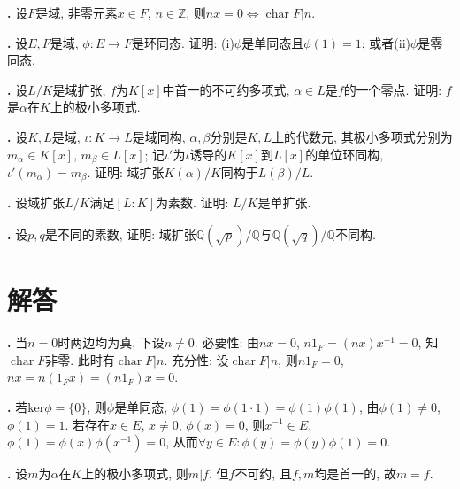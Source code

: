 \par \textbf{\theprobfld .} 设$F$是域, 非零元素$x\in F$, $n\in \mathbb{Z}$, 则$nx=0 \iff \operatorname{char} F | n$. 

\par \textbf{\theprobfld .} \cite{AlXX} 设$E, F$是域, $\phi: E\to F$是环同态. 证明: (i)$\phi$是单同态且$\phi(1)=1$; 或者(ii)$\phi$是零同态. 

\par \textbf{\theprobfld .} \cite{GTS} 设$L/K$是域扩张, $f$为$K[x]$中首一的不可约多项式, $\alpha \in L$是$f$的一个零点. 证明: $f$是$\alpha$在$K$上的极小多项式. 

\par \textbf{\theprobfld .} \cite{GTS} 设$K,L$是域, $\iota: K\to L$是域同构, $\alpha, \beta$分别是$K,L$上的代数元, 其极小多项式分别为$m_\alpha \in K[x]$, $m_\beta \in L[x]$; 记$\iota'$为$\iota$诱导的$K[x]$到$L[x]$的单位环同构, $\iota'(m_\alpha)=m_\beta$. 证明: 域扩张$K(\alpha)/K$同构于$L(\beta)/L$.  

\par \textbf{\theprobfld .} \cite{GTS} 设域扩张$L/K$满足$[L:K]$为素数. 证明: $L/K$是单扩张. 

\par \textbf{\theprobfld .} 设$p,q$是不同的素数, 证明: 域扩张$\mathbb{Q}(\sqrt{p})/\mathbb{Q}$与$\mathbb{Q}(\sqrt{q})/\mathbb{Q}$不同构. 



\section*{解答}

\par \textbf{\thesolfld .} 当$n=0$时两边均为真, 下设$n\neq 0$. 必要性: 由$nx=0$, $n1_F=(nx)x^{-1}=0$, 知$\operatorname{char}F$非零. 此时有$\operatorname{char}F \vert n$. 充分性: 设$\operatorname{char}F \vert n$, 则$n1_F=0$, $nx=n(1_Fx)=(n1_F)x=0$.

\par \textbf{\thesolfld .} 若$\mathrm{ker}\phi=\{0\}$, 则$\phi$是单同态, $\phi(1)=\phi(1\cdot 1)=\phi(1)\phi(1)$, 由$\phi(1)\neq 0$, $\phi(1)=1$. 若存在$x\in E$, $x\neq 0$,  $\phi(x)=0$, 则$x^{-1}\in E$, $\phi(1)=\phi(x)\phi(x^{-1})=0$, 从而$\forall y\in E: \phi(y)=\phi(y)\phi(1)=0$.

\par \textbf{\thesolfld .} \cite{GTS} 设$m$为$\alpha$在$K$上的极小多项式, 则$m\vert f$. 但$f$不可约, 且$f,m$均是首一的, 故$m=f$. 

